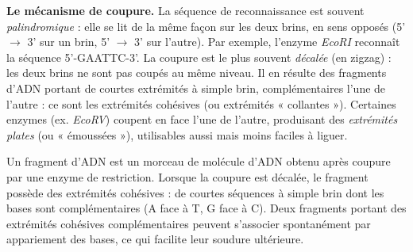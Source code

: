 \documentclass[11pt]{article}
\newcommand{\cle}[1]{{\popxbold\color{popdark}#1}}
\begin{document}
\textbf{Le mécanisme de coupure.} La séquence de reconnaissance est souvent \emph{palindromique} : elle se lit de la même façon sur les deux brins, en sens opposés (5' $\to$ 3' sur un brin, 5' $\to$ 3' sur l'autre). Par exemple, l'enzyme \emph{EcoRI} reconnaît la séquence 5'-GAATTC-3'. La coupure est le plus souvent \emph{décalée} (en zigzag) : les deux brins ne sont pas coupés au même niveau. Il en résulte des fragments d'ADN portant de courtes extrémités à simple brin, complémentaires l'une de l'autre : ce sont les \cle{extrémités cohésives} (ou extrémités « collantes »). Certaines enzymes (ex. \emph{EcoRV}) coupent en face l'une de l'autre, produisant des \emph{extrémités plates} (ou « émoussées »), utilisables aussi mais moins faciles à liguer.

\begin{definition}
Un \cle{fragment d'ADN} est un morceau de molécule d'ADN obtenu après coupure par une enzyme de restriction. Lorsque la coupure est décalée, le fragment possède des \cle{extrémités cohésives} : de courtes séquences à simple brin dont les bases sont complémentaires (A face à T, G face à C). Deux fragments portant des extrémités cohésives complémentaires peuvent s'associer spontanément par appariement des bases, ce qui facilite leur soudure ultérieure.
\end{definition}
\end{document}
